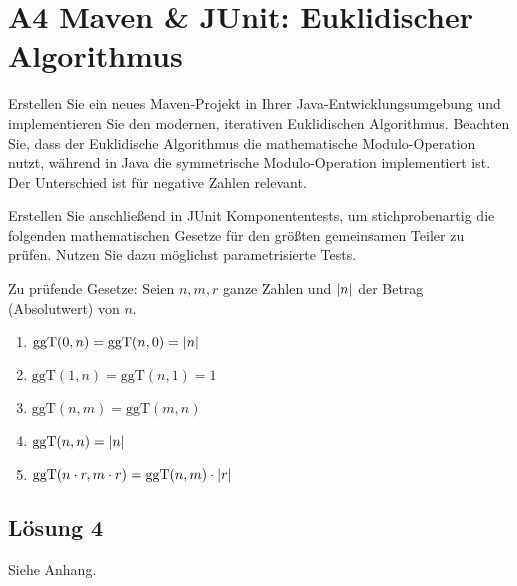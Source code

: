 \documentclass[main.tex]{subfiles}
\begin{document}
\section{A4 Maven \& JUnit: Euklidischer Algorithmus}

Erstellen Sie ein neues Maven-Projekt in Ihrer Java-Entwicklungsumgebung und implementieren Sie den modernen, iterativen Euklidischen Algorithmus. Beachten Sie, dass der Euklidische Algorithmus die mathematische Modulo-Operation nutzt, während in Java die symmetrische Modulo-Operation implementiert ist. Der Unterschied ist für negative Zahlen relevant.

Erstellen Sie anschließend in JUnit Komponententests, um stichprobenartig die folgenden mathematischen Gesetze für den größten gemeinsamen Teiler zu prüfen. Nutzen Sie dazu möglichst parametrisierte Tests.

Zu prüfende Gesetze: Seien $n, m, r$ ganze Zahlen und $\lvert n\rvert$ der Betrag (Absolutwert) von $n$.
\begin{enumerate}
    \item $\text{ggT}(0, n) = \text{ggT}(n, 0) = \lvert n\rvert$
    \item $\text{ggT}(1, n) = \text{ggT}(n, 1) = 1$
    \item $\text{ggT}(n, m) = \text{ggT}(m, n)$
    \item $\text{ggT}(n, n) = \lvert n\rvert$
    \item $\text{ggT}(n \cdot r, m \cdot r) = \text{ggT}(n, m) \cdot \lvert r\rvert$
\end{enumerate}

\subsection{Lösung 4}
Siehe Anhang.
\end{document}
